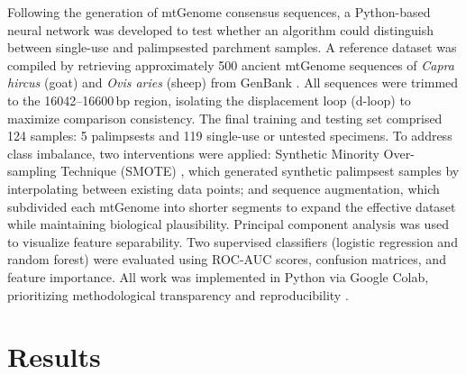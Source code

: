 \documentclass[final]{anthology-ch} %
\begin{document}
Following the generation of mtGenome consensus sequences, a Python-based neural network was developed to test whether an algorithm could distinguish between single-use and palimpsested parchment samples. A reference dataset was compiled by retrieving approximately 500 ancient mtGenome sequences of \textit{Capra hircus} (goat) and \textit{Ovis aries} (sheep) from GenBank \cite{cassidy2017capturing, meadows2007five, naderi2007large}. All sequences were trimmed to the 16042--16600\,bp region, isolating the displacement loop (d-loop) to maximize comparison consistency. The final training and testing set comprised 124 samples: 5 palimpsests and 119 single-use or untested specimens. To address class imbalance, two interventions were applied: Synthetic Minority Over-sampling Technique (SMOTE) \cite{chawla2002smote}, which generated synthetic palimpsest samples by interpolating between existing data points; and sequence augmentation, which subdivided each mtGenome into shorter segments to expand the effective dataset while maintaining biological plausibility. Principal component analysis \cite{jolliffe2016principal} was used to visualize feature separability. Two supervised classifiers (logistic regression and random forest) were evaluated using ROC-AUC scores, confusion matrices, and feature importance. All work was implemented in Python via Google Colab, prioritizing methodological transparency and reproducibility \cite{schoch2013big, stokes2009computer, camps2016chanson}.

\section{Results} \label{sec:results}
\end{document}
